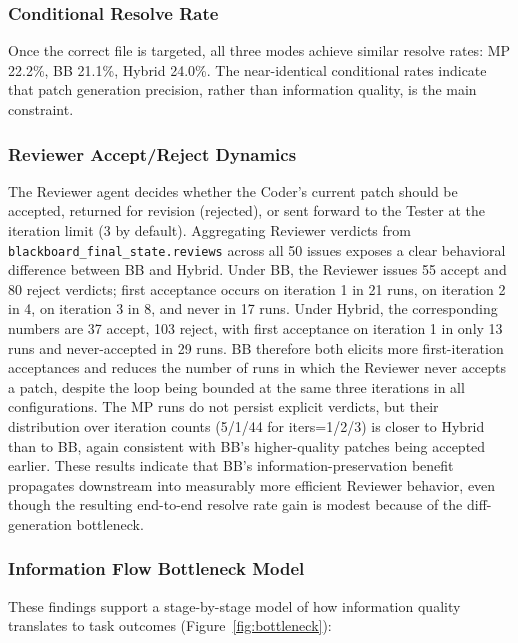 \documentclass{ieeeaccess}
\begin{document}
\subsubsection{Conditional Resolve Rate}

Once the correct file is targeted, all three modes achieve similar resolve rates: MP 22.2\%, BB 21.1\%, Hybrid 24.0\%. The near-identical conditional rates indicate that patch generation precision, rather than information quality, is the main constraint.

\subsubsection{Reviewer Accept/Reject Dynamics}
\label{sec:reviewer-dynamics}

The Reviewer agent decides whether the Coder's current patch should be accepted, returned for revision (rejected), or sent forward to the Tester at the iteration limit (3 by default). Aggregating Reviewer verdicts from \texttt{blackboard\_final\_state.reviews} across all 50 issues exposes a clear behavioral difference between BB and Hybrid. Under BB, the Reviewer issues 55 accept and 80 reject verdicts; first acceptance occurs on iteration 1 in 21 runs, on iteration 2 in 4, on iteration 3 in 8, and never in 17 runs. Under Hybrid, the corresponding numbers are 37 accept, 103 reject, with first acceptance on iteration 1 in only 13 runs and never-accepted in 29 runs. BB therefore both elicits more first-iteration acceptances and reduces the number of runs in which the Reviewer never accepts a patch, despite the loop being bounded at the same three iterations in all configurations. The MP runs do not persist explicit verdicts, but their distribution over iteration counts (5/1/44 for iters=1/2/3) is closer to Hybrid than to BB, again consistent with BB's higher-quality patches being accepted earlier. These results indicate that BB's information-preservation benefit propagates downstream into measurably more efficient Reviewer behavior, even though the resulting end-to-end resolve rate gain is modest because of the diff-generation bottleneck.

\subsubsection{Information Flow Bottleneck Model}

These findings support a stage-by-stage model of how information quality translates to task outcomes (Figure~\ref{fig:bottleneck}):
\end{document}
